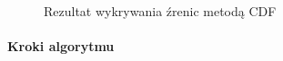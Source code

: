 \begin{figure}[!h]
\begin{center}
    \end{center}
    \caption{Rezultat wykrywania źrenic metodą CDF}
    \label{fig:cdf_results}
\end{figure}
\fi

\paragraph{Kroki algorytmu}

